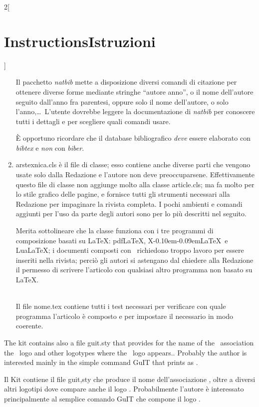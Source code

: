 \documentclass[12pt]{article}
\providecommand\pdfLaTeX{pdf\/\-\LaTeX}
\providecommand\XeLaTeX{X\kern-0.10em\raisebox{1.1ex}{\rotatebox{180}{E}}\kern-0.09em\-\LaTeX}
\providecommand\LuaLaTeX{Lua\-\LaTeX}
\providecommand\file[1]{\textnormal{\ttfamily#1}}
\providecommand\cs[1]{\textnormal{\ttfamily\char92#1}}
\providecommand\pack[1]{\textnormal{\sffamily\slshape#1}}
\providecommand\prog[1]{\textnormal{\ttfamily\itshape#1}}
\providecommand\italian{\selectlanguage{italian}}
\providecommand\english{\selectlanguage{english}}
\begin{document}
\begin{paracol}{2}[\section{Instructions\hspace{5.6em}Istruzioni}]
\begin{enumerate}[noitemsep]
Il pacchetto \pack{natbib} mette a disposizione diversi comandi di citazione per ottenere diverse forme mediante stringhe “autore anno”, o il nome dell'autore seguito dall'anno fra parentesi, oppure solo il nome dell'autore, o solo l'anno,\dots\ L'utente dovrebbe leggere la documentazione di \pack{natbib} per conoscere tutti i dettagli e per scegliere quali comandi usare.

È opportuno ricordare che il database bibliografico \emph{deve} essere elaborato con \prog{bibtex} e \emph{non} con \prog{biber}.
%
\item \file{arstexnica.cls} è il file di classe; esso contiene anche diverse parti che vengono usate solo dalla Redazione e l'autore non deve preoccuparsene. Effettivamente questo file di classe non aggiunge molto alla classe \file{article.cls}; ma fa molto per lo stile grafico  delle pagine, e fornisce tutti gli strumenti necessari alla Redazione per impaginare la rivista completa. I pochi ambienti e comandi aggiunti per l'uso da parte degli autori sono per lo più descritti nel seguito.

Merita sottolineare che la classe funziona con i tre programmi di composizione basati su \LaTeX: \pdfLaTeX, \XeLaTeX\ e \LuaLaTeX; i documenti composti con \ConTeXt\ richiedono troppo lavoro per essere inseriti nella rivista; perciò gli autori si astengano dal chiedere alla Redazione il permesso di scrivere l'articolo con qualsiasi altro programma non basato su \LaTeX.\\~

Il file \file{nome.tex} contiene tutti i test necessari per verificare con quale programma l'articolo è composto e per impostare il necessario in modo coerente.
%
\end{enumerate}

\english
The kit contains also a file \file{guit.sty} that provides for the name of the \GuIT\ association the \GuIT\ logo and other logotypes where the \GuIT\ logo appears.. 
Probably the author is interested mainly in the simple command \cs{GuIT} that prints as \GuIT.

\italian
Il Kit contiene il file \file{guit,sty}  che produce il nome dell'associazione \GuIT, oltre a diversi altri logotipi dove compare anche il logo \GuIT. 
Probabilmente l'autore è interessato principalmente al semplice comando \cs{GuIT} che compone il logo \GuIT.



\end{paracol}
\end{document}
